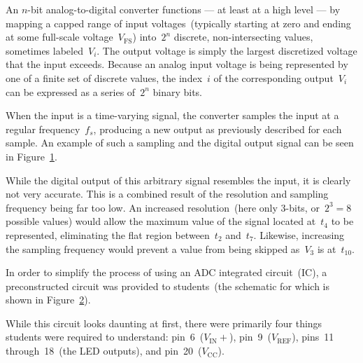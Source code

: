 An $n$-bit analog-to-digital converter functions --- at least at a high level
--- by mapping a capped range of input voltages~(typically starting at zero and ending
at some full-scale voltage~$V_\text{FS}$) into~$2^n$ discrete, non-intersecting
values, sometimes labeled~$V_i$.  The output voltage is simply the largest
discretized voltage that the input exceeds.  Because an analog input voltage is
being represented by one of a finite set of discrete values, the index~$i$ of
the corresponding output~$V_i$ can be expressed as a series of~$2^n$ binary
bits.

When the input is a time-varying signal, the converter samples the input
at a regular frequency~$f_s$, producing a new output as previously described
for each sample.  An example of such a sampling and the digital output signal
can be seen in Figure~\ref{fig:theory}.
%
\begin{figure}[H]
	\centering
	\caption{}
	\label{fig:theory}
\end{figure}
%
While the digital output of this arbitrary signal resembles the input, it is
clearly not very accurate.  This is a combined result of the resolution and
sampling frequency being far too low.  An increased resolution~(here only
3-bits, or~$2^3 = 8$ possible values) would allow the maximum value of the
signal located at~$t_4$ to be represented, eliminating the flat region
between~$t_2$ and~$t_7$.  Likewise, increasing the sampling frequency would
prevent a value from being skipped as~$V_3$ is at~$t_{10}$.

In order to simplify the process of using an ADC integrated circuit~(IC), a
preconstructed circuit was provided to students~(the schematic for which is
shown in Figure~\ref{fig:adcSchem}).
%
\begin{figure}[H]
	\centering
	
	\label{fig:adcSchem}
\end{figure}
%
While this circuit looks daunting at first, there were primarily four things
students were required to understand:  pin~6~($V_\text{IN}+$),
pin~9~($V_\text{REF}$), pins~11 through~18~(the LED outputs), and
pin~20~($V_\text{CC}$).

